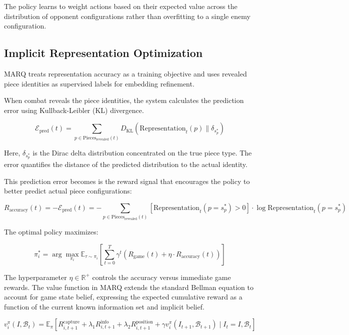 The policy learns to weight actions based on their expected value across the distribution of opponent configurations rather than overfitting to a single enemy configuration.

\subsection{Implicit Representation Optimization}

MARQ treats representation accuracy as a training objective and uses revealed piece identities as supervised labels for embedding refinement.

When combat reveals the piece identities, the system calculates the prediction error using Kullback-Leibler (KL) divergence.

\begin{equation}
\mathcal{E}_{\text{pred}}(t) = \sum_{p \in \text{Pieces}_{\text{revealed}}(t)} D_{\text{KL}}\left(\text{Representation}_t(p) \| \delta_{s^*_p}\right)
\end{equation}

Here, $\delta_{s^*_p}$ is the Dirac delta distribution concentrated on the true piece type. The error quantifies the distance of the predicted distribution to the actual identity.

This prediction error becomes is the reward signal that encourages the policy to better predict actual piece configurations:

\begin{equation}
R_{\text{accuracy}}(t) = -\mathcal{E}_{\text{pred}}(t) = -\sum_{p \in \text{Pieces}_{\text{revealed}}(t)} \left[\text{Representation}_t(p=s^*_p) > 0\right] \cdot \log \text{Representation}_t(p=s^*_p)
\end{equation}

The optimal policy maximizes:

\begin{equation}
\pi^*_i = \arg\max_{\pi_i} \mathbb{E}_{\tau \sim \pi_i}\left[\sum_{t=0}^T \gamma^t \left(R_{\text{game}}(t) + \eta \cdot R_{\text{accuracy}}(t)\right)\right]
\end{equation}

The hyperparameter $\eta \in \mathbb{R}^+$ controls the accuracy versus immediate game rewards. The value function in MARQ extends the standard Bellman equation to account for game state belief, expressing the expected cumulative reward as a function of the current known information set and implicit belief.

\begin{equation}
v^{\pi}_i(I, \mathcal{B}_t) = \mathbb{E}_{\pi}\left[R^{\text{capture}}_{i,t+1} + \lambda_1 R^{\text{info}}_{i,t+1} + \lambda_2 R^{\text{position}}_{i,t+1} + \gamma v^{\pi}_i(I_{t+1}, \mathcal{B}_{t+1}) \mid I_t = I, \mathcal{B}_t\right]
\end{equation}

